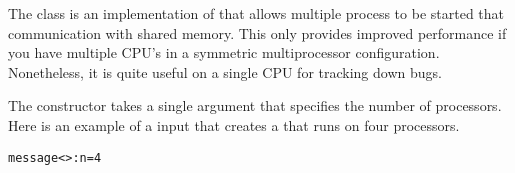 

The  class is an implementation of
 that allows multiple process to be
started that communication with shared memory.  This
only provides improved performance if you have multiple
CPU's in a symmetric multiprocessor configuration.  Nonetheless,
it is quite useful on a single CPU for tracking down bugs.

The   constructor takes
a single argument that specifies the number of processors.
Here is an example of a  input that
creates a  that runs on four processors.
\begin{alltt}
message<>: n = 4
\end{alltt}
